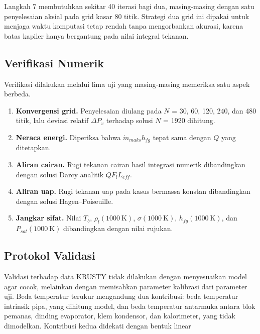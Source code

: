 \documentclass[
  indonesian,
  12pt,
  a4paper,
]{report}
\providecommand{\tightlist}{%
  \setlength{\itemsep}{0pt}\setlength{\parskip}{0pt}}
\begin{document}
Langkah 7 membutuhkan sekitar 40 iterasi bagi dua, masing-masing dengan
satu penyelesaian aksial pada grid kasar 80 titik. Strategi dua grid ini
dipakai untuk menjaga waktu komputasi tetap rendah tanpa mengorbankan
akurasi, karena batas kapiler hanya bergantung pada nilai integral
tekanan.

\subsection{Verifikasi Numerik}\label{verifikasi-numerik}

Verifikasi dilakukan melalui lima uji yang masing-masing memeriksa satu
aspek berbeda.

\begin{enumerate}
\def\labelenumi{\arabic{enumi}.}
\tightlist
\item
  \textbf{Konvergensi grid.} Penyelesaian diulang pada \(N\) = 30, 60,
  120, 240, dan 480 titik, lalu deviasi relatif \(\Delta P_v\) terhadap
  solusi \(N\) = 1920 dihitung.
\item
  \textbf{Neraca energi.} Diperiksa bahwa \(\dot m_{maks} h_{fg}\) tepat
  sama dengan \(Q\) yang ditetapkan.
\item
  \textbf{Aliran cairan.} Rugi tekanan cairan hasil integrasi numerik
  dibandingkan dengan solusi Darcy analitik \(Q F_l L_{eff}\).
\item
  \textbf{Aliran uap.} Rugi tekanan uap pada kasus bermassa konstan
  dibandingkan dengan solusi Hagen--Poiseuille.
\item
  \textbf{Jangkar sifat.} Nilai \(T_b\), \(\rho_l(1000\ \mathrm{K})\),
  \(\sigma(1000\ \mathrm{K})\), \(h_{fg}(1000\ \mathrm{K})\), dan
  \(P_{sat}(1000\ \mathrm{K})\) dibandingkan dengan nilai rujukan.
\end{enumerate}

\subsection{Protokol Validasi}\label{protokol-validasi}

Validasi terhadap data KRUSTY tidak dilakukan dengan menyesuaikan model
agar cocok, melainkan dengan memisahkan parameter kalibrasi dari
parameter uji. Beda temperatur terukur mengandung dua kontribusi: beda
temperatur intrinsik pipa, yang dihitung model, dan beda temperatur
antarmuka antara blok pemanas, dinding evaporator, klem kondensor, dan
kalorimeter, yang tidak dimodelkan. Kontribusi kedua didekati dengan
bentuk linear
\end{document}
